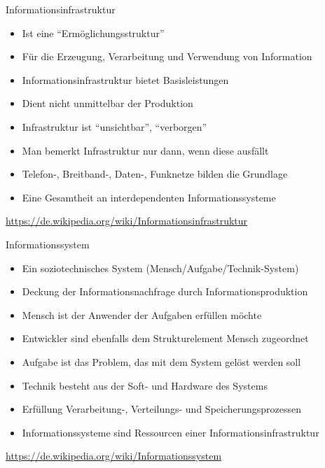 \documentclass{beamer}
\begin{document}
\begin{frame}{Informationsinfrastruktur}
	
	\begin{itemize}
		\item Ist eine ``Ermöglichungsstruktur''
		\item Für die Erzeugung, Verarbeitung und Verwendung von Information
		\item Informationsinfrastruktur bietet Basisleistungen
		\item Dient nicht unmittelbar der Produktion
		\item Infrastruktur ist ``unsichtbar'', ``verborgen''
		\item Man bemerkt Infrastruktur nur dann, wenn diese ausfällt
		\item Telefon-, Breitband-, Daten-, Funknetze bilden die Grundlage
		\item Eine Gesamtheit an interdependenten Informationssysteme
	\end{itemize}
	
	\begin{flushright}
		\scriptsize\url{https://de.wikipedia.org/wiki/Informationsinfrastruktur}
	\end{flushright}
	
\end{frame}


\begin{frame}{Informationssystem}
	
	\begin{itemize}
		\item Ein soziotechnisches System (Mensch/Aufgabe/Technik-System)
		\item Deckung der Informationsnachfrage durch Informationsproduktion
		\item Mensch ist der Anwender der Aufgaben erfüllen möchte
		\item Entwickler sind ebenfalls dem Strukturelement Mensch zugeordnet
		\item Aufgabe ist das Problem, das mit dem System gelöst werden soll
		\item Technik besteht aus der Soft- und Hardware des Systems
		\item Erfüllung Verarbeitung-, Verteilungs- und Speicherungsprozessen
		\item Informationssysteme sind Ressourcen einer Informationsinfrastruktur
	\end{itemize}
	
	\begin{flushright}
		\scriptsize\url{https://de.wikipedia.org/wiki/Informationssystem}
	\end{flushright}
	
\end{frame}
\end{document}
